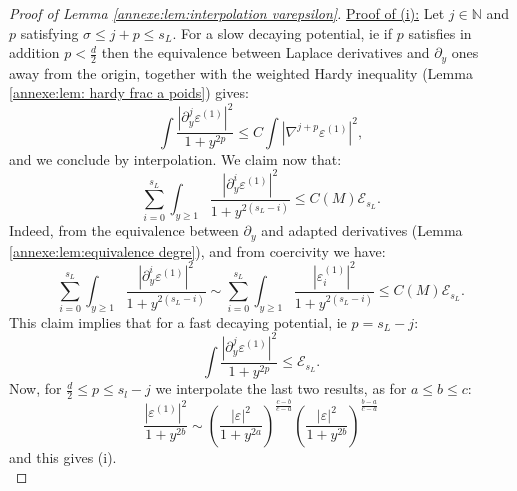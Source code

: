 \documentclass[11pt,a4paper,reqno]{amsart}
\theoremstyle{remark}
\numberwithin{equation}{section}
\begin{document}
\begin{appendix}
\begin{proof}[Proof of Lemma \ref{annexe:lem:interpolation varepsilon}]
\underline{Proof of (i):} Let $j\in \mathbb{N}$ and $p$ satisfying $\sigma\leq j+p\leq s_L$. For a slow decaying potential, ie if $p$ satisfies in addition $p<\frac{d}{2}$ then the equivalence between Laplace derivatives and $\partial_y$ ones away from the origin, together with the weighted Hardy inequality (Lemma \ref{annexe:lem: hardy frac a poids}) gives:
$$
\int \frac{|\partial_y^j \varepsilon^{(1)}|^2}{1+y^{2p}}\leq C \int |\nabla^{j+p}\varepsilon^{(1)}|^2 ,
$$
and we conclude by interpolation. We claim now that:
$$
\sum_{i=0}^{s_L} \int_{y\geq 1} \frac{|\partial_y^i \varepsilon^{(1)}|^2}{1+y^{2(s_L-i)}}\leq C(M) \mathcal{E}_{s_L} .
$$
Indeed, from the equivalence between $\partial_y$ and adapted derivatives (Lemma \ref{annexe:lem:equivalence degre}), and from coercivity we have:
$$
\sum_{i=0}^{s_L} \int_{y\geq 1} \frac{|\partial_y^i \varepsilon^{(1)}|^2}{1+y^{2(s_L-i)}} \sim \sum_{i=0}^{s_L} \int_{y\geq 1} \frac{|\varepsilon_i^{(1)}|^2}{1+y^{2(s_L-i)}} \leq C(M) \mathcal{E}_{s_L} .
$$
This claim implies that for a fast decaying potential, ie $p=s_L-j$:
$$
\int \frac{|\partial_y^j \varepsilon^{(1)}|^2}{1+y^{2p}}\leq \mathcal{E}_{s_L} .
$$
Now, for $\frac{d}{2}\leq p\leq s_l-j$ we interpolate the last two results, as for $a\leq b\leq c$:
$$
\frac{|\varepsilon^{(1)}|^2}{1+y^{2b}}\sim \left( \frac{|\varepsilon|^2}{1+y^{2a}}\right)^{\frac{c-b}{c-a}} \left( \frac{|\varepsilon|^2}{1+y^{2b}}\right)^{\frac{b-a}{c-a}}
$$
and this gives (i).\\


\end{proof}
\end{appendix}
\end{document}
